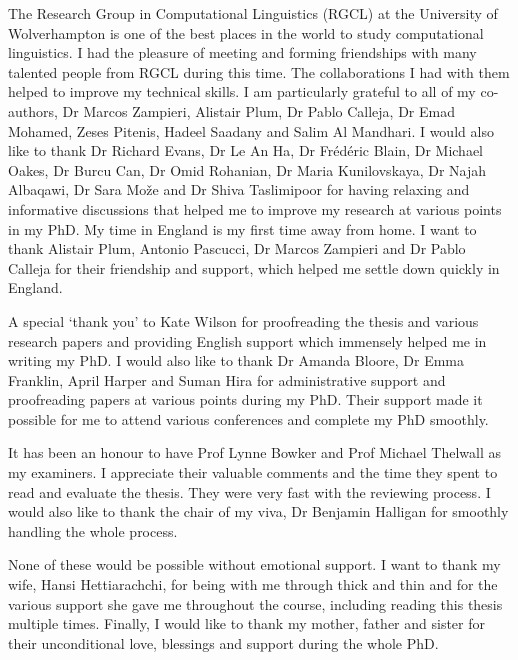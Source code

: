 The Research Group in Computational Linguistics (RGCL) at the University of Wolverhampton is one of the best places in the world to study computational linguistics. I had the pleasure of meeting and forming friendships with many talented people from RGCL during this time. The collaborations I had with them helped to improve my technical skills. I am particularly grateful to all of my co-authors, Dr Marcos Zampieri, Alistair Plum, Dr Pablo Calleja, Dr Emad Mohamed, Zeses Pitenis, Hadeel Saadany and Salim Al Mandhari. I would also like to thank Dr Richard Evans, Dr Le An Ha, Dr Frédéric Blain, Dr Michael Oakes, Dr Burcu Can, Dr Omid Rohanian, Dr Maria Kunilovskaya, Dr Najah Albaqawi, Dr Sara Može and Dr Shiva Taslimipoor for having relaxing and informative discussions that helped me to improve my research at various points in my PhD. My time in England is my first time away from home. I want to thank Alistair Plum, Antonio Pascucci, Dr Marcos Zampieri and Dr Pablo Calleja for their friendship and support, which helped me settle down quickly in England.  

A special ‘thank you’ to Kate Wilson for proofreading the thesis and various research papers and providing English support which immensely helped me in writing my PhD. I would also like to thank Dr Amanda Bloore, Dr Emma Franklin, April Harper and Suman Hira for administrative support and proofreading papers at various points during my PhD. Their support made it possible for me to attend various conferences and complete my PhD smoothly.

It has been an honour to have Prof Lynne Bowker and Prof Michael Thelwall as my examiners. I appreciate their valuable comments and the time they spent to read and evaluate the thesis. They were very fast with the reviewing process. I would also like to thank the chair of my viva, Dr Benjamin Halligan for smoothly handling the whole process.

None of these would be possible without emotional support. I want to thank my wife, Hansi Hettiarachchi, for being with me through thick and thin and for the various support she gave me throughout the course, including reading this thesis multiple times. Finally, I would like to thank my mother, father and sister for their unconditional love, blessings and support during the whole PhD.



